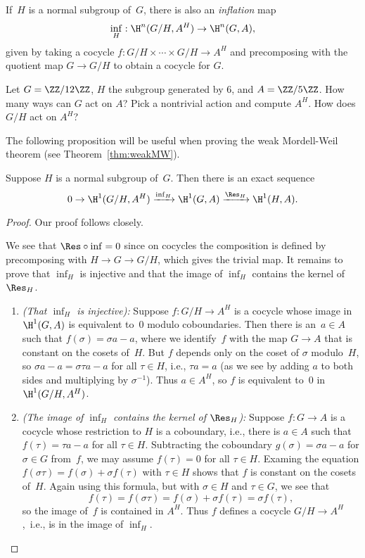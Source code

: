If~$H$ is a normal subgroup of~$G$, there is also an \emph{inflation} map
\[
  \inf_H : \H^n(G/H, A^H) \to \H^n(G,A),
\]
given by taking a cocycle $f : G/H \times \cdots \times G/H \to A^H$
and precomposing with the quotient map $G\to G/H$ to
obtain a cocycle for $G$.

\begin{exercise}
  Let $G = \ZZ/12\ZZ$, $H$ the subgroup generated by $6$, and $A = \ZZ/5\ZZ$.
  How many ways can $G$ act on $A$? Pick a nontrivial action and compute $A^H$.
  How does $G/H$ act on $A^H$?
\end{exercise}

The following proposition will be useful when proving
the weak Mordell-Weil theorem (see Theorem~\ref{thm:weakMW}).
\begin{proposition}\label{prop:infres}
  Suppose $H$ is a normal subgroup of~$G$.
  Then there is an exact sequence
  \[
    0 \to \H^1(G/H, A^H)
    \xrightarrow{\inf_H} \H^1(G,A)
    \xrightarrow{\Res_H} \H^1(H,A).
  \]
\end{proposition}
\begin{proof}
  Our proof follows \cite[pg.~117]{serre:localfields} closely.
  
  We see that $\Res\circ \inf = 0$ since on cocycles the composition is
  defined by precomposing with $H\to G\to G/H$, which gives the trivial map.
  It remains to prove that $\inf_H$ is injective and that the image of $\inf_H$
  contains the kernel of $\Res_H$.
  \begin{enumerate}
    \item {\em (That $\inf_H$ is injective):}
    Suppose $f:G/H\to A^H$ is a cocycle whose image in $\H^1(G,A)$
    is equivalent to~$0$ modulo coboundaries. Then there is an~$a\in A$
    such that $f(\sigma) = \sigma a - a$, where we identify~$f$ with
    the map $G\to A$ that is constant on the cosets of~$H$. But $f$
    depends only on the coset of $\sigma$ modulo~$H$, so
    $\sigma a - a = \sigma \tau a - a$ for all $\tau \in H$, i.e.,
    $\tau a = a$ (as we see by adding $a$ to both sides and multiplying
    by $\sigma^{-1}$). Thus $a\in A^H$, so $f$ is equivalent to~$0$ in
    $\H^1(G/H,A^H)$.
    
    \item {\em (The image of $\inf_H$ contains the kernel of $\Res_H$):}
    Suppose $f:G\to A$ is a cocycle whose
    restriction to $H$ is a coboundary, i.e., there is $a\in A$ such
    that $f(\tau) = \tau a - a$ for all $\tau \in H$.
    Subtracting the coboundary $g(\sigma) = \sigma a - a$ for $\sigma\in G$
    from~$f$, we may assume $f(\tau) = 0$ for all $\tau \in H$.
    Examing the equation $f(\sigma\tau) = f(\sigma) + \sigma f(\tau)$
    with $\tau\in H$ shows that $f$ is constant on the cosets of~$H$.
    Again using this formula, but with $\sigma\in H$ and $\tau\in G$, we see
    that
    \[
      f(\tau) = f(\sigma \tau) = f(\sigma) + \sigma f(\tau) = \sigma f(\tau),
    \]
    so the image of~$f$ is contained in $A^H$.  Thus $f$ defines a cocycle
    $G/H \to A^H$,~i.e., is in the image of $\inf_H$.
  \end{enumerate}
\end{proof}

